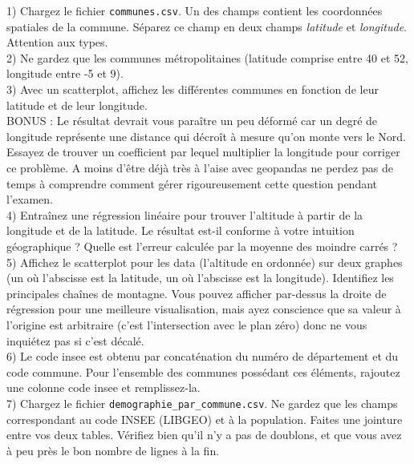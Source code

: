 \documentclass[a4paper]{article}
\begin{document}
1) Chargez le fichier \texttt{communes.csv}. Un des champs contient les coordonnées spatiales de la commune. Séparez ce champ en deux champs \textit{latitude} et \textit{longitude}. Attention aux types.\\

2) Ne gardez que les communes métropolitaines (latitude comprise entre 40 et 52, longitude entre -5 et 9).\\

3) Avec un scatterplot, affichez les différentes communes en fonction de leur latitude et de leur longitude. \\

BONUS : Le résultat devrait vous paraître un peu déformé car un degré de longitude représente une distance qui décroît à mesure qu'on monte vers le Nord. Essayez de trouver un coefficient par lequel multiplier la longitude pour corriger ce problème. A moins d'être déjà très à l'aise avec geopandas ne perdez pas de temps à comprendre comment gérer rigoureusement cette question pendant l'examen.\\

4) Entraînez une régression linéaire pour trouver l'altitude à partir de la longitude et de la latitude. Le résultat est-il conforme à votre intuition géographique ? Quelle est l'erreur calculée par la moyenne des moindre carrés ?\\

5) Affichez le scatterplot pour les data (l'altitude en ordonnée) sur deux graphes (un où l'abscisse est la latitude, un où l'abscisse est la longitude). Identifiez les principales chaînes de montagne. Vous pouvez afficher par-dessus la droite de régression pour une meilleure visualisation, mais ayez conscience que sa valeur à l'origine est arbitraire (c'est l'intersection avec le plan zéro) donc ne vous inquiétez pas si c'est décalé.\\

6) Le code insee est obtenu par concaténation du numéro de département et du code commune. Pour l'ensemble des communes possédant ces éléments, rajoutez une colonne code insee et remplissez-la.\\

7) Chargez le fichier \texttt{demographie\_par\_commune.csv}. Ne gardez que les champs correspondant au code INSEE (LIBGEO) et à la population. Faites une jointure entre vos deux tables. Vérifiez bien qu'il n'y a pas de doublons, et que vous avez à peu près le bon nombre de lignes à la fin.\\
\end{document}
